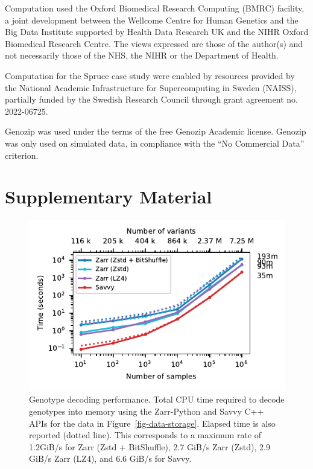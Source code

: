 \documentclass[a4paper,num-refs]{oup-contemporary}
\begin{document}
Computation used the Oxford Biomedical Research Computing (BMRC) facility, a
joint development between the Wellcome Centre for Human Genetics and the Big
Data Institute supported by Health Data Research UK and the NIHR Oxford
Biomedical Research Centre. The views expressed are those of the author(s) and
not necessarily those of the NHS, the NIHR or the Department of Health.

Computation for the Spruce case study were enabled by resources
provided by the National Academic Infrastructure for Supercomputing in
Sweden (NAISS), partially funded by the Swedish Research Council
through grant agreement no. 2022-06725.

Genozip was used under the terms of the free Genozip Academic license.
Genozip was only used on simulated data, in compliance with
the ``No Commercial Data'' criterion.



\renewcommand\thefigure{S\arabic{figure}}
\setcounter{figure}{0}
\renewcommand\thetable{S\arabic{table}}
\setcounter{table}{0}

\section*{Supplementary Material}

\begin{figure}[h]
\includegraphics{figures/whole-matrix-decode}
\caption{Genotype decoding performance.
Total CPU time required to decode genotypes into memory using the Zarr-Python
and Savvy C++ APIs for the data in Figure~\ref{fig-data-storage}.
Elapsed time is also reported (dotted line). 
This corresponds to a maximum rate of 1.2GiB/s for Zarr (Zstd + BitShuffle),
2.7 GiB/s Zarr (Zstd), 2.9 GiB/s Zarr (LZ4), and 6.6 GiB/s for Savvy. 
\label{fig-whole-matrix-decode}}
\end{figure}
\end{document}
